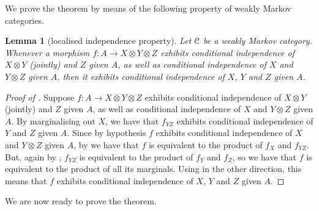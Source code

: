 \documentclass[a4paper,UKenglish,numberwithinsect,cleveref, autoref, thm-restate]{lipics-v2021}
\theoremstyle{plain} %
\newtheorem{mylemma}[mytheorem]{Lemma}
\theoremstyle{definition} %
\begin{document}
We prove the theorem by means of the following property of weakly Markov categories.

\begin{mylemma}[localised independence property]\label{local}
 Let $\mathcal{C}$ be a weakly Markov category. Whenever a morphism  $f:A\to X\otimes Y\otimes Z$ exhibits conditional independence of $X\otimes Y$ (jointly) and $Z$ given $A$, as well as conditional independence of $X$ and $Y\otimes Z$ given $A$, then it exhibits conditional independence of $X$, $Y$ and $Z$ given $A$. 
\end{mylemma}
\begin{proof}[Proof of ]
 Suppose $f:A\to X\otimes Y\otimes Z$ exhibits conditional independence of $X\otimes Y$ (jointly) and $Z$ given $A$, as well as conditional independence of $X$ and $Y\otimes Z$ given $A$.
 By marginalising out $X$, we have that $f_{YZ}$ exhibits conditional independence of $Y$ and $Z$ given $A$. 
 Since by hypothesis $f$ exhibits conditional independence of $X$ and $Y\otimes Z$ given $A$, by  we have that $f$ is equivalent to the product  of $f_X$ and $f_{YZ}$. But, again by , $f_{YZ}$ is equivalent to the product of $f_Y$ and $f_Z$, so we have that $f$ is equivalent to the product of all its marginals. Using  in the other direction, this means that $f$ exhibits conditional independence of $X$, $Y$ and $Z$ given $A$. 
\end{proof}
 
We are now ready to prove the theorem.
\end{document}
